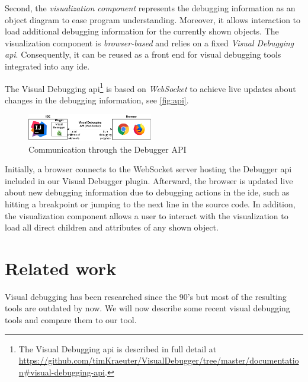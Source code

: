 \documentclass[conference]{IEEEtran}
\begin{document}
Second, the \textit{visualization component} represents the debugging information as an object diagram to ease program understanding.
Moreover, it allows interaction to load additional debugging information for the currently shown objects.
The visualization component is \emph{browser-based} and relies on a fixed \emph{Visual Debugging \gls*{api}}.
Consequently, it can be reused as a front end for visual debugging tools integrated into any \gls*{ide}.

The Visual Debugging \gls*{api}\footnote{The Visual Debugging \gls*{api} is described in full detail at \url{https://github.com/timKraeuter/VisualDebugger/tree/master/documentation\#visual-debugging-api}.} is based on \emph{WebSocket} to achieve live updates about changes in the debugging information, see \autoref{fig:api}.

\begin{figure}[h]
    \centering
    \includegraphics[width=0.488\textwidth]{images/VD-architecture.pdf}
    \caption{Communication through the Debugger API}
    \label{fig:api}
\end{figure}

Initially, a browser connects to the WebSocket server hosting the Debugger \gls*{api} included in our Visual Debugger plugin.
Afterward, the browser is updated live about new debugging information due to debugging actions in the \gls*{ide}, such as hitting a breakpoint or jumping to the next line in the source code.
In addition, the visualization component allows a user to interact with the visualization to load all direct children and attributes of any shown object.

\section{Related work} \label{sec:relatedWork}
Visual debugging has been researched since the 90's \cite{baeza-yatesVisualDebuggingAutomatic1996, jerdingUsingVisualizationFoster1994, mukherjeaVisualDebuggingIntegrating1994, hansonSimpleExtensibleGraphical1997} but most of the resulting tools are outdated by now.
We will now describe some recent visual debugging tools and compare them to our tool.
\end{document}
